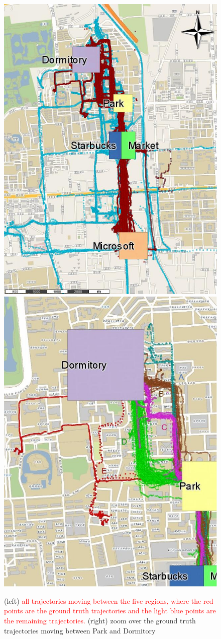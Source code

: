 \documentclass[12pt]{article}
\begin{document}
\begin{figure}[ht!]
\centering
\centerline{
\includegraphics[width=.5\textwidth]{Images/new_Geolife-Trajectories-painted.jpg}
\includegraphics[width=.5\textwidth]{Images/Geolife-Paths-painted.jpg}
}
\caption{(left) \textcolor{Red}{all trajectories moving between the five regions, where the red points are the ground truth trajectories and the light blue points are the remaining trajectories.} (right) zoom over the ground truth trajectories moving between Park and Dormitory}
\label{fig:geolife_map_rois}
\end{figure}
\end{document}
